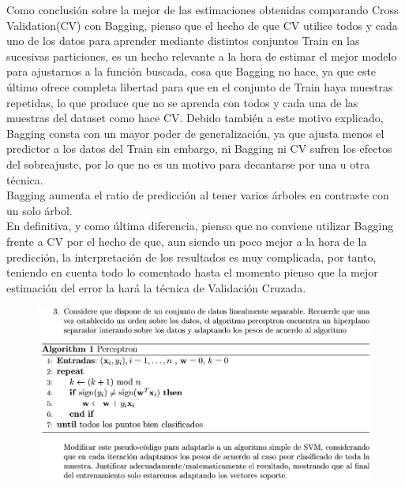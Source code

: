 Como conclusión sobre la mejor de las estimaciones obtenidas comparando Cross Validation(CV) con Bagging, pienso que el hecho de que CV utilice todos y cada uno de los datos para aprender mediante distintos conjuntos Train en las sucesivas particiones, es un hecho relevante a la hora de estimar el mejor modelo para ajustarnos a la función buscada, cosa que Bagging no hace, ya que este último ofrece completa libertad para que en el conjunto de Train haya muestras repetidas, lo que produce que no se aprenda con todos y cada una de las muestras del dataset como hace CV. Debido también a este motivo explicado, Bagging consta con un mayor poder de generalización, ya que ajusta menos el predictor a los datos del Train sin embargo, ni Bagging ni CV sufren los efectos del sobreajuste, por lo que no es un motivo para decantarse por una u otra técnica.\\
Bagging aumenta el ratio de predicción al tener varios árboles en contraste con un solo árbol.\\
En definitiva, y como última diferencia, pienso que no conviene utilizar Bagging frente a CV por el hecho de que, aun siendo un poco mejor a la hora de la predicción, la interpretación de los resultados es muy complicada, por tanto, teniendo en cuenta todo lo comentado hasta el momento pienso que la mejor estimación del error la hará la técnica de Validación Cruzada.


\begin{figure}[H]
	\includegraphics[scale=0.65]{imagenes/3} 
\end{figure}

